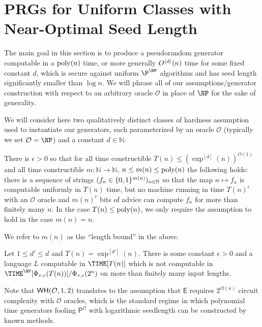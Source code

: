 \section{PRGs for Uniform Classes with Near-Optimal Seed Length}\label{randomstrings:sec:PRG}
The main goal in this section is to produce a pseudorandom generator computable in a $\mathrm{poly}(n)$ time, or more generally $O^{\langle d \rangle}(n)$ time for some fixed constant $d$, which is secure against uniform $\P^{\NP}$ algorithms and has seed length significantly smaller than $\log n$. We will phrase all of our assumptions/generator construction with respect to an arbitrary oracle $\mathcal{O}$ in place of $\NP$ for the sake of generality.

We will consider here two qualitatively distinct classes of hardness assumption used to instantiate our generators, each parameterized by an oracle $\mathcal{O}$ (typically we set $\mathcal{O}=\NP$) and a constant $d\in \mathbb{N}$: 
\begin{hypothesis}\label{randomstrings:hyp:strong}
There is $\epsilon > 0$ so that for all time constructible $T(n) \leq (\exp^{[d]}(n))^{O(1)}$ and all time constructible $m: \mathbb{N} \to \mathbb{N}$, $n \leq m(n) \leq \mathrm{poly}(n)$ the following holds: there is a sequence of strings $(f_n\in \{0,1\}^{m(n)} )_{n \in \mathbb{N}}$ so that the map $n \mapsto f_n$ is computable uniformly in $T(n)$ time, but no machine running in time $T(n)^{\epsilon}$ with an $\mathcal{O}$ oracle and $m(n)^\epsilon$ bits of advice can compute $f_n$ for more than finitely many $n$. In the case $T(n) \leq \mathrm{poly}(n)$, we only require the assumption to hold in the case $m(n) = n$. 
\end{hypothesis}

We refer to $m(n)$ as the ``length bound'' in the above.

\begin{hypothesis}\label{randomstrings:hyp:weak}
Let $1 \leq d' \leq d$ and $T(n) = \exp^{[d']}(n)$. There is some constant $\epsilon > 0$ and a language $L$ computable in $\TIME[T(n)]$ which is not computable in $\TIME^\NP[\semi{v}{\epsilon}(T(n))]/\semi{v}{\epsilon}(2^n)$ on more than finitely many input lengths.
\end{hypothesis}
Note that $\mathsf{WH}(\mathcal{O},1,2)$ translates to the assumption that $\mathsf{E}$ requires $2^{\Omega(n)}$ circuit complexity with $\mathcal{O}$ oracles, which is the standard regime in which polynomial time generators fooling $\mathsf{P}^{\mathcal{O}}$ with logarithmic seedlength can be constructed by known methods.

